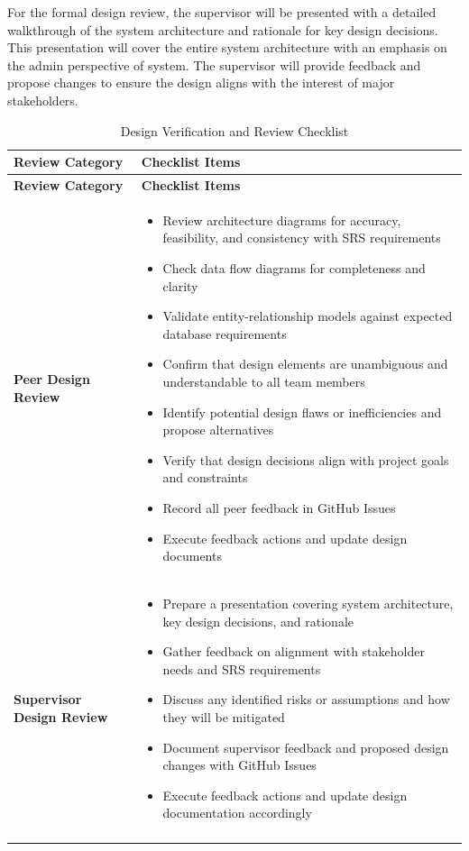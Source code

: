 \documentclass[12pt, titlepage]{article}
\begin{document}
For the formal design review, the supervisor will be presented with a detailed walkthrough of the system architecture and rationale for key design decisions. This presentation will cover the entire system architecture with an emphasis on the admin perspective of system. The supervisor will provide feedback and propose changes to ensure the design aligns with the interest of major stakeholders.

\begin{longtable}{|p{4cm}|p{11cm}|}
\hline
\textbf{Review Category} & \textbf{Checklist Items} \\
\hline
\endfirsthead

\hline
\textbf{Review Category} & \textbf{Checklist Items} \\
\hline
\endhead

\textbf{Peer Design Review} &
\begin{itemize}
  \item Review architecture diagrams for accuracy, feasibility, and consistency with SRS requirements
  \item Check data flow diagrams for completeness and clarity
  \item Validate entity-relationship models against expected database requirements
  \item Confirm that design elements are unambiguous and understandable to all team members
  \item Identify potential design flaws or inefficiencies and propose alternatives
  \item Verify that design decisions align with project goals and constraints
  \item Record all peer feedback in GitHub Issues
  \item Execute feedback actions and update design documents
\end{itemize}
\\
\hline

\textbf{Supervisor Design Review} &
\begin{itemize}
  \item Prepare a presentation covering system architecture, key design decisions, and rationale
  \item Gather feedback on alignment with stakeholder needs and SRS requirements
  \item Discuss any identified risks or assumptions and how they will be mitigated
  \item Document supervisor feedback and proposed design changes with GitHub Issues
  \item Execute feedback actions and update design documentation accordingly
\end{itemize}
\\
\hline

\caption{Design Verification and Review Checklist}
\label{tab:design_verification_checklist}
\end{longtable}
\end{document}
